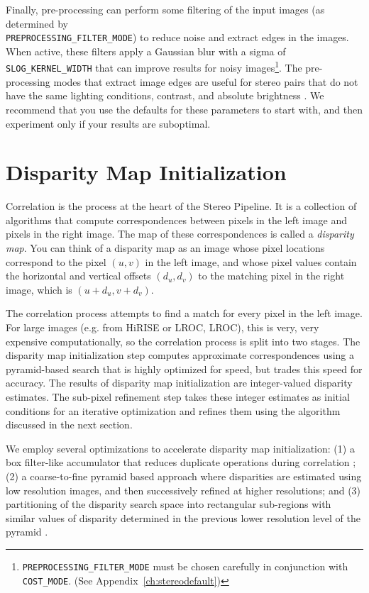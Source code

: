 Finally, pre-processing can perform some filtering of the input
images (as determined by \\
\texttt{PREPROCESSING\_FILTER\_MODE}) to
reduce noise and extract edges in the images.  When active, these
filters apply a Gaussian blur with a sigma of \texttt{SLOG\_KERNEL\_WIDTH}
that can improve results for noisy
images\footnote{\texttt{PREPROCESSING\_FILTER\_MODE} must be
  chosen carefully in conjunction with \texttt{COST\_MODE}.  (See
  Appendix~\ref{ch:stereodefault})}.  The pre-processing modes that
extract image edges are useful for stereo pairs that do not have
the same lighting conditions, contrast, and absolute
brightness \citep{Nishihara84practical}.  We recommend that you use
the defaults for these parameters to start with, and then experiment
only if your results are suboptimal.

\section{Disparity Map Initialization}

Correlation is the process at the heart of the Stereo Pipeline.  It is
a collection of algorithms that compute correspondences between pixels
in the left image and pixels in the right image.  The map of these
correspondences is called a {\em disparity map}.  You can think of a
disparity map as an image whose pixel locations correspond to
the pixel $(u,v)$ in the left image, and whose pixel values
contain the horizontal and vertical offsets $(d_u, d_v)$ to the
matching pixel in the right image, which is $(u+d_u, v+d_v)$.  

The correlation process attempts to find a match for every pixel
in the left image.  For large images (e.g. from \ac{HiRISE} or
\acl{LROC}, \acs{LROC}), this is very, very expensive computationally,
so the correlation process is split into two stages.  The disparity
map initialization step computes approximate correspondences using
a pyramid-based search that is highly optimized for speed, but
trades this speed for accuracy.  The results of disparity map
initialization are integer-valued disparity estimates.  The sub-pixel
refinement step takes these integer estimates as initial conditions
for an iterative optimization and refines them using the algorithm
discussed in the next section.

We employ several optimizations to accelerate disparity map
initialization: (1) a box filter-like accumulator that reduces
duplicate operations during correlation \citep{Sun02rectangular}; (2) a
coarse-to-fine pyramid based approach where disparities are estimated
using low resolution images, and then successively refined at higher
resolutions; and (3) partitioning of the disparity search space into
rectangular sub-regions with similar values of disparity determined in
the previous lower resolution level of the
pyramid \citep{Sun02rectangular}.

